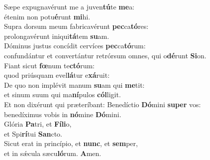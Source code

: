 \evenverse Sæpe expugnavérunt me a juven\textbf{tú}te \textbf{me}a:~\*\\
\evenverse étenim non potu\textbf{é}runt \textbf{mi}hi.\\
\oddverse Supra dorsum meum fabricavérunt \textbf{pec}ca\textbf{tó}res:~\*\\
\oddverse prolongavérunt iniqui\textbf{tá}tem \textbf{su}am.\\
\evenverse Dóminus justus concídit cervíces \textbf{pec}ca\textbf{tó}rum:~\*\\
\evenverse confundántur et convertántur retrórsum omnes, qui o\textbf{dé}runt \textbf{Si}on.\\
\oddverse Fiant sicut \textbf{fœ}num te\textbf{ctó}rum:~\*\\
\oddverse quod priúsquam evel\textbf{lá}tur e\textbf{xá}ruit:\\
\evenverse De quo non implévit manum \textbf{su}am qui \textbf{me}tit:~\*\\
\evenverse et sinum suum qui ma\textbf{ní}pulos \textbf{cól}ligit.\\
\oddverse Et non dixérunt qui præteríbant: Benedíctio \textbf{Dó}mini \textbf{su}\textbf{per} vos:~\*\\
\oddverse benedíximus vobis in \textbf{nó}mine \textbf{Dó}mini.\\
\evenverse Glória \textbf{Pa}tri, et \textbf{Fí}\textbf{li}o,~\*\\
\evenverse et Spi\textbf{rí}tui \textbf{San}cto.\\
\oddverse Sicut erat in princípio, et \textbf{nunc}, et \textbf{sem}per,~\*\\
\oddverse et in sǽcula sæcu\textbf{ló}rum. \textbf{A}men.\\
